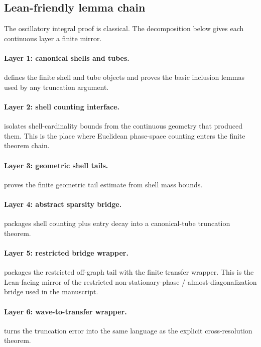 \subsection{Lean-friendly lemma chain}

The oscillatory integral proof is classical. The decomposition below gives each continuous layer a finite mirror.

\paragraph{Layer 1: canonical shells and tubes.}
 defines the finite shell and tube objects and proves the basic inclusion lemmas used by any truncation argument.

\paragraph{Layer 2: shell counting interface.}
 isolates shell-cardinality bounds from the continuous geometry that produced them. This is the place where Euclidean phase-space counting enters the finite theorem chain.

\paragraph{Layer 3: geometric shell tails.}
 proves the finite geometric tail estimate from shell mass bounds.

\paragraph{Layer 4: abstract sparsity bridge.}
 packages shell counting plus entry decay into a canonical-tube truncation theorem.

\paragraph{Layer 5: restricted bridge wrapper.}
 packages the restricted off-graph tail with the finite transfer wrapper. This is the Lean-facing mirror of the restricted non-stationary-phase / almost-diagonalization bridge used in the manuscript.

\paragraph{Layer 6: wave-to-transfer wrapper.}
 turns the truncation error into the same language as the explicit cross-resolution theorem.

